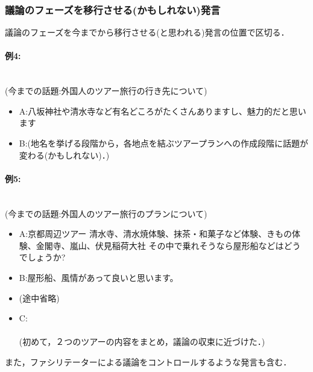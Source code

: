  \subsubsection*{議論のフェーズを移行させる(かもしれない)発言}
議論のフェーズを今までから移行させる(と思われる)発言の位置で区切る．
\paragraph{例4:}\ \\
(今までの話題:外国人のツアー旅行の行き先について)
\begin{itemize}
\item A:八坂神社や清水寺など有名どころがたくさんありますし、魅力的だと思います
\item B:(地名を挙げる段階から，各地点を結ぶツアープランへの作成段階に話題が変わる(かもしれない)．)
\end{itemize}

\paragraph{例5:}\ \\
(今までの話題:外国人のツアー旅行のプランについて)
\begin{itemize}
\item A:京都周辺ツアー
 清水寺、清水焼体験、抹茶・和菓子など体験、きもの体験、金閣寺、嵐山、伏見稲荷大社
 その中で乗れそうなら屋形船などはどうでしょうか?
\item B:屋形船、風情があって良いと思います。
\item (途中省略)
\item C: 
 \\
 \\
 (初めて，２つのツアーの内容をまとめ，議論の収束に近づけた．)
 \end{itemize}
また，ファシリテーターによる議論をコントロールするような発言も含む．

